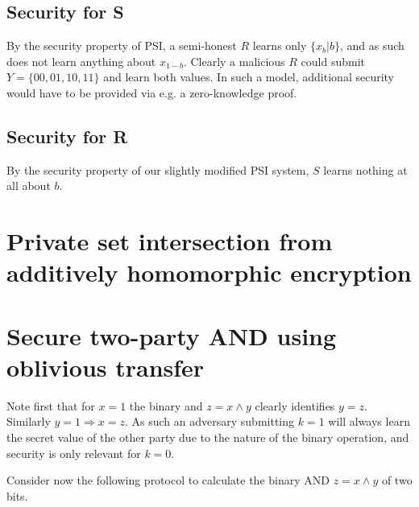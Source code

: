 \documentclass[a4paper]{scrreprt}
\begin{document}
\subsection{Security for S}

By the security property of PSI, a semi-honest $R$ learns only $\{x_b | b\}$,
and as such does not learn anything about $x_{1 - b}$. Clearly a malicious $R$
could submit $Y = \{00, 01, 10, 11\}$ and learn both values. In such a model,
additional security would have to be provided via e.g. a zero-knowledge proof.

\subsection{Security for R}

By the security property of our slightly modified PSI system, $S$ learns
nothing at all about $b$.

\section{Private set intersection from additively homomorphic encryption}

\section{Secure two-party AND using oblivious transfer}

Note first that for $x = 1$ the binary and $z = x \land y$ clearly identifies
$y = z$. Similarly $y = 1 \Rightarrow x = z$. As such an adversary submitting
$k = 1$ will always learn the secret value of the other party due to the nature
of the binary operation, and security is only relevant for $k = 0$.

Consider now the following protocol to calculate the binary AND $z = x \land y$
of two bits.

\end{document}
